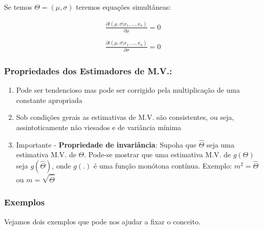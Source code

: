 \documentclass[
  letterpaper,
  DIV=11,
  numbers=noendperiod]{scrartcl}
\begin{document}
Se temos \(\Theta=(\mu,\sigma)\) teremos equações simultâneas:

\[\begin{array}{ccc}
\frac{\partial l(\mu,\sigma|x_1,...,x_n) }{\partial \mu} = 0
\\
\\
\frac{\partial l(\mu,\sigma|x_1,...,x_n) }{\partial \sigma} = 0
\end{array}\]

\subsubsection{Propriedades dos Estimadores de
M.V.:}\label{propriedades-dos-estimadores-de-m.v.}

\begin{enumerate}
\def\labelenumi{\arabic{enumi}.}
\item
  Pode ser tendencioso mas pode ser corrigido pela multiplicação de uma
  constante apropriada
\item
  Sob condições gerais as estimativas de M.V. são consistentes, ou seja,
  assintoticamente não viesados e de variância mínima
\item
  Importante - \textbf{Propriedade de invariância}: Supoha que
  \(\hat{\Theta}\) seja uma estimativa M.V. de \(\Theta\). Pode-se
  mostrar que uma estimativa M.V. de \(g(\Theta)\) seja
  \(g(\hat{\Theta})\), onde \(g(.)\) é uma função monótona contínua.
  Exemplo: \(m^2=\hat{\Theta}\) ou \(m=\sqrt{\hat{\Theta}}\)
\end{enumerate}

\subsubsection{Exemplos}\label{exemplos}

Vejamos dois exemplos que pode nos ajudar a fixar o conceito.
\end{document}
